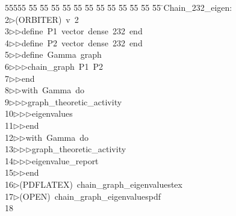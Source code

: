 %
%
\begin{tabbing}
55555 \= 55 \= 55 \= 55 \= 55 \= 55 \= 55 \= 55 \= 55 \= 55 \= 55 \= 55 \= 55 \= \>Chain\_232\_eigen:\\[0pt]
2\>$\triangleright$\>(ORBITER)\ v\ 2\ \\[0pt]
3\>$\triangleright$\>$\triangleright$\>define\ P1\ vector\ dense\ 232\ end\ \\[0pt]
4\>$\triangleright$\>$\triangleright$\>define\ P2\ vector\ dense\ 232\ end\ \\[0pt]
5\>$\triangleright$\>$\triangleright$\>define\ Gamma\ graph\ \\[0pt]
6\>$\triangleright$\>$\triangleright$\>$\triangleright$\>chain\_graph\ P1\ P2\ \\[0pt]
7\>$\triangleright$\>$\triangleright$\>end\ \\[0pt]
8\>$\triangleright$\>$\triangleright$\>with\ Gamma\ do\ \\[0pt]
9\>$\triangleright$\>$\triangleright$\>$\triangleright$\>graph\_theoretic\_activity\ \\[0pt]
10\>$\triangleright$\>$\triangleright$\>$\triangleright$\>eigenvalues\ \\[0pt]
11\>$\triangleright$\>$\triangleright$\>end\ \\[0pt]
12\>$\triangleright$\>$\triangleright$\>with\ Gamma\ do\ \\[0pt]
13\>$\triangleright$\>$\triangleright$\>$\triangleright$\>graph\_theoretic\_activity\ \\[0pt]
14\>$\triangleright$\>$\triangleright$\>$\triangleright$\>eigenvalue\_report\ \\[0pt]
15\>$\triangleright$\>$\triangleright$\>end\\[0pt]
16\>$\triangleright$\>(PDFLATEX)\ chain\_graph\_eigenvaluestex\\[0pt]
17\>$\triangleright$\>(OPEN)\ chain\_graph\_eigenvaluespdf\\[0pt]
18\>\end{tabbing}
